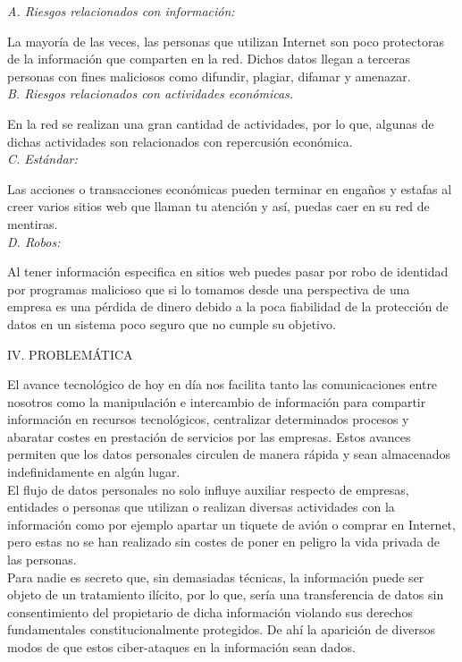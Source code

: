 \documentclass[9pt,24pt,twocolumn]{article}
\begin{document}
\textit{A.  Riesgos relacionados con información:}

{La mayoría de las veces, las personas que utilizan Internet son poco protectoras de la información que comparten en la red. Dichos datos llegan a terceras personas con fines maliciosos como difundir, plagiar, difamar y amenazar.}
\\

\textit{B.  Riesgos relacionados con actividades económicas. }

{En la red se realizan una gran cantidad de actividades, por lo que, algunas de dichas actividades son relacionados con repercusión económica.}
\\

\textit{C.  Estándar:  }

{Las acciones o transacciones económicas pueden terminar en engaños y estafas al creer varios sitios web que llaman tu atención y así, puedas caer en su red de mentiras.}
\\

\textit{D.  Robos: }

{Al tener información especifica en sitios web puedes pasar por robo de identidad por programas malicioso que si lo tomamos desde una perspectiva de una empresa es una pérdida de dinero debido a la poca fiabilidad de la protección de datos en un sistema poco seguro que no cumple su objetivo.}
\\

\begin{center}
{IV.  PROBLEMÁTICA}
\end{center}

{El avance tecnológico de hoy en día nos facilita tanto las comunicaciones entre nosotros como la manipulación e intercambio de información para compartir información en recursos tecnológicos, centralizar determinados procesos y abaratar costes en prestación de servicios por las empresas. Estos avances permiten que los datos personales circulen de manera rápida y sean almacenados indefinidamente en algún lugar.}
\\

{El flujo de datos personales no solo influye auxiliar respecto de empresas, entidades o personas que utilizan o realizan diversas actividades con la información como por ejemplo apartar un tiquete de avión o comprar en Internet, pero estas no se han realizado sin costes de poner en peligro la vida privada de las personas.}
\\

{Para nadie es secreto que, sin demasiadas técnicas, la información puede ser objeto de un tratamiento ilícito, por lo que, sería una transferencia de datos sin consentimiento del propietario de dicha información violando sus derechos fundamentales constitucionalmente protegidos. De ahí la aparición de diversos modos de que estos ciber-ataques en la información sean dados.}
\\
\end{document}
